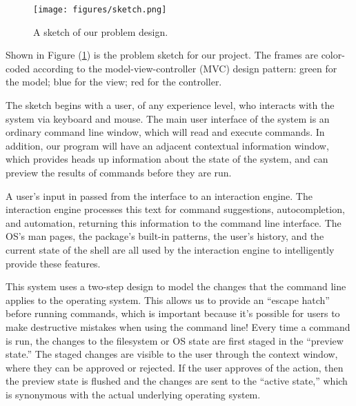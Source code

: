 \begin{figure}[h]
  \centering
  \texttt{[image: figures/sketch.png]}
  \caption{A sketch of our problem design.}
  \label{fig:sketch}
\end{figure}

Shown in Figure (\ref{fig:sketch}) is the problem sketch for our project. The
frames are color-coded according to the model-view-controller (MVC) design
pattern: green for the model; blue for the view; red for the controller.

The sketch begins with a user, of any experience level, who interacts with the
system via keyboard and mouse. The main user interface of the system is an
ordinary command line window, which will read and execute commands. In addition,
our program will have an adjacent contextual information window, which provides
heads up information about the state of the system, and can preview the results
of commands before they are run.

A user's input in passed from the interface to an interaction engine. The
interaction engine processes this text for command suggestions, autocompletion,
and automation, returning this information to the command line interface. The
OS's man pages, the package's built-in patterns, the user's history, and the
current state of the shell are all used by the interaction engine to
intelligently provide these features.

This system uses a two-step design to model the changes that the command line
applies to the operating system. This allows us to provide an ``escape hatch''
before running commands, which is important because it's possible for users to
make destructive mistakes when using the command line! Every time a command is
run, the changes to the filesystem or OS state are first staged in the ``preview
state.'' The staged changes are visible to the user through the context window,
where they can be approved or rejected. If the user approves of the action, then
the preview state is flushed and the changes are sent to the ``active state,''
which is synonymous with the actual underlying operating system.
